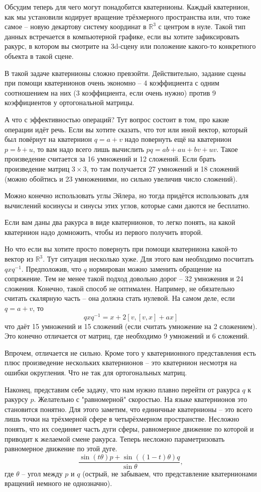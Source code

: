 \documentclass[12pt,a4paper,oneside]{book}
\theoremstyle{definition}
\newcommand{\R}{\mathbb R}
\begin{document}
Обсудим теперь для чего могут понадобится кватернионы. Каждый кватернион, как мы установили кодирует вращение трёхмерного пространства или, что тоже самое -- новую декартову систему координат в $\R^3$ с центром в нуле. Такой тип данных встречается в компьютерной графике, если вы хотите зафиксировать ракурс, в котором вы смотрите на 3d-сцену или положение какого-то конкретного объекта в такой сцене.

В такой задаче кватернионы сложно превзойти. Действительно, задание сцены при помощи кватернионов очень экономно -- 4 коэффициента с одним соотношением на них (3 коэффициента, если очень нужно) против 9 коэффициентов у ортогональной матрицы.

А что с эффективностью операций? Тут вопрос состоит в том, про какие операции идёт речь. Если вы хотите сказать, что тот или иной вектор, который был повёрнут на кватернион $q=a+v$ надо повернуть ещё на кватернион $p=b+u$, то вам надо всего лишь вычислить $pq=ab+au+bv+uv$. Такое произведение считается за 16 умножений и 12 сложений. Если брать произведение матриц $3\times 3$, то там получается 27 умножений и 18 сложений (можно обойтись и 23 умножениями, но сильно увеличив число сложений).

Можно конечно использовать углы Эйлера, но тогда придётся использовать для вычислений косинусы и синусы этих углов, которые сами даются не бесплатно.

Если вам даны два ракурса в виде кватернионов, то легко понять, на какой кватернион надо домножить, чтобы из первого получить второй.

Но что если вы хотите просто повернуть при помощи кватерниона какой-то вектор из $\R^3$. Тут ситуация несколько хуже. Для этого вам необходимо посчитать $qxq^{-1}$. Предположив, что $q$ нормирован можно заменить обращение на сопряжение. Тем не менее такой подход довольно дорог -- 32 умножения и 24 сложения. Конечно, такой способ не оптимален. Например, не обязательно считать скалярную часть -- она должна стать нулевой. На самом деле, если $q=a+v$, то 
$$qxq^{-1}=x+ 2[v, [v,x]+ ax]$$
что даёт 15 умножений и 15 сложений (если считать умножение на 2 сложением). Это конечно отличается от матриц, где необходимо 9 умножений и 6 сложений.

Впрочем, отличается не сильно. Кроме того у кватернионного представления есть плюс произведение нескольких кватернионов -- это кватернион несмотря на ошибки округления. Что не так для ортогональных матриц.

Наконец, представим себе задачу, что нам нужно плавно перейти от ракурса $q$ к ракурсу $p$. Желательно с "равномерной" скоростью. На языке кватернионов это становится понятно. Для этого заметим, что единичные кватернионы -- это всего лишь точки на трёхмерной сфере в четырёхмерном пространстве. Несложно понять, что их соединяет часть дуги сферы, равномерное движение по которой и приводит к желаемой смене ракурса. Теперь несложно параметризовать равномерное движение по этой дуге. 
$$ \frac{\sin(t\theta)p + \sin ((1-t)\theta) q}{\sin \theta},$$
где $\theta$ -- угол между $p$ и $q$ (острый, не забываем, что представление кватернионами вращений немного не однозначно).
\end{document}
